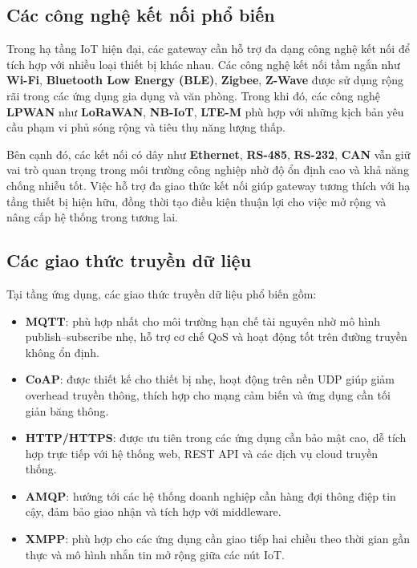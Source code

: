         \subsection{Các công nghệ kết nối phổ biến}
            Trong hạ tầng IoT hiện đại, các gateway cần hỗ trợ đa dạng công nghệ kết nối để tích hợp với nhiều loại thiết bị khác nhau. Các công nghệ kết nối tầm ngắn như \textbf{Wi-Fi}, \textbf{Bluetooth Low Energy (BLE)}, \textbf{Zigbee}, \textbf{Z-Wave} được sử dụng rộng rãi trong các ứng dụng gia dụng và văn phòng. Trong khi đó, các công nghệ \textbf{LPWAN} như \textbf{LoRaWAN}, \textbf{NB-IoT}, \textbf{LTE-M} phù hợp với những kịch bản yêu cầu phạm vi phủ sóng rộng và tiêu thụ năng lượng thấp.

            Bên cạnh đó, các kết nối có dây như \textbf{Ethernet}, \textbf{RS-485}, \textbf{RS-232}, \textbf{CAN} vẫn giữ vai trò quan trọng trong môi trường công nghiệp nhờ độ ổn định cao và khả năng chống nhiễu tốt. Việc hỗ trợ đa giao thức kết nối giúp gateway tương thích với hạ tầng thiết bị hiện hữu, đồng thời tạo điều kiện thuận lợi cho việc mở rộng và nâng cấp hệ thống trong tương lai.
        \subsection{Các giao thức truyền dữ liệu}
            Tại tầng ứng dụng, các giao thức truyền dữ liệu phổ biến gồm:
            \begin{itemize}
                \item \textbf{MQTT}: phù hợp nhất cho môi trường hạn chế tài nguyên nhờ mô hình publish--subscribe nhẹ, hỗ trợ cơ chế QoS và hoạt động tốt trên đường truyền không ổn định.
                \item \textbf{CoAP}: được thiết kế cho thiết bị nhẹ, hoạt động trên nền UDP giúp giảm overhead truyền thông, thích hợp cho mạng cảm biến và ứng dụng cần tối giản băng thông.
                \item \textbf{HTTP/HTTPS}: được ưu tiên trong các ứng dụng cần bảo mật cao, dễ tích hợp trực tiếp với hệ thống web, REST API và các dịch vụ cloud truyền thống.
                \item \textbf{AMQP}: hướng tới các hệ thống doanh nghiệp cần hàng đợi thông điệp tin cậy, đảm bảo giao nhận và tích hợp với middleware.
                \item \textbf{XMPP}: phù hợp cho các ứng dụng cần giao tiếp hai chiều theo thời gian gần thực và mô hình nhắn tin mở rộng giữa các nút IoT.
            \end{itemize}
